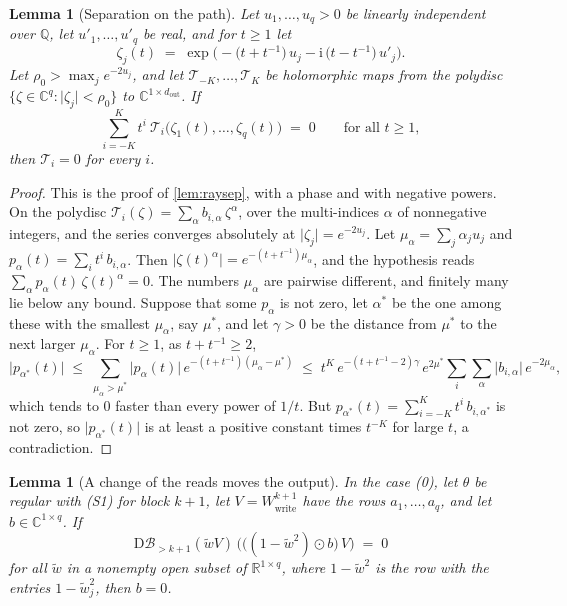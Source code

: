 \documentclass[10pt]{article}
\newtheorem{lemma}[theorem]{Lemma}
\theoremstyle{definition}
\theoremstyle{remark}
\newcommand{\R}{\mathbb{R}}
\newcommand{\Wwrite}{W_{\mathrm{write}}}
\newcommand{\Der}{\mathrm{D}}
\begin{document}
\begin{lemma}[Separation on the path]\label{lem:e0sep}
Let $u_1, \dots, u_q > 0$ be linearly independent over $\mathbb Q$, let $u'_1, \dots, u'_q$ be real, and for $t \ge 1$ let
\[
\zeta_j(t) \;=\; \exp\Big(-\big(t + t^{-1}\big)\,u_j - \mathrm i\,\big(t - t^{-1}\big)\,u'_j\Big).
\]
Let $\rho_0 > \max_j e^{-2u_j}$, and let $\mathcal T_{-K}, \dots, \mathcal T_K$ be holomorphic maps from the polydisc $\{\zeta \in \mathbb C^q : \lvert\zeta_j\rvert < \rho_0\}$ to $\mathbb C^{1\times d_{\mathrm{out}}}$. If
\[
\sum_{i=-K}^{K} t^i\ \mathcal T_i\big(\zeta_1(t), \dots, \zeta_q(t)\big) \;=\; 0 \qquad\text{for all } t \ge 1,
\]
then $\mathcal T_i = 0$ for every $i$.
\end{lemma}

\begin{proof}
This is the proof of \cref{lem:raysep}, with a phase and with negative powers. On the polydisc $\mathcal T_i(\zeta) = \sum_\alpha b_{i,\alpha}\,\zeta^\alpha$, over the multi-indices $\alpha$ of nonnegative integers, and the series converges absolutely at $\lvert\zeta_j\rvert = e^{-2u_j}$. Let $\mu_\alpha = \sum_j\alpha_ju_j$ and $p_\alpha(t) = \sum_i t^i\,b_{i,\alpha}$. Then $\lvert\zeta(t)^\alpha\rvert = e^{-(t + t^{-1})\mu_\alpha}$, and the hypothesis reads $\sum_\alpha p_\alpha(t)\,\zeta(t)^\alpha = 0$. The numbers $\mu_\alpha$ are pairwise different, and finitely many lie below any bound. Suppose that some $p_\alpha$ is not zero, let $\alpha^*$ be the one among these with the smallest $\mu_\alpha$, say $\mu^*$, and let $\gamma > 0$ be the distance from $\mu^*$ to the next larger $\mu_\alpha$. For $t \ge 1$, as $t + t^{-1} \ge 2$,
\[
\lvert p_{\alpha^*}(t)\rvert \;\le\; \sum_{\mu_\alpha > \mu^*}\lvert p_\alpha(t)\rvert\,e^{-(t + t^{-1})(\mu_\alpha - \mu^*)} \;\le\; t^K\,e^{-(t + t^{-1} - 2)\gamma}\,e^{2\mu^*}\sum_{i}\sum_\alpha\lvert b_{i,\alpha}\rvert\,e^{-2\mu_\alpha},
\]
which tends to $0$ faster than every power of $1/t$. But $p_{\alpha^*}(t) = \sum_{i=-K}^{K}t^i\,b_{i,\alpha^*}$ is not zero, so $\lvert p_{\alpha^*}(t)\rvert$ is at least a positive constant times $t^{-K}$ for large $t$, a contradiction.
\end{proof}

\begin{lemma}[A change of the reads moves the output]\label{lem:e0wedge}
In the case (0), let $\theta$ be regular with (S1) for block $k+1$, let $V = \Wwrite^{k+1}$ have the rows $a_1, \dots, a_q$, and let $b \in \mathbb C^{1\times q}$. If
\[
\Der\mathcal B_{>k+1}(\tilde wV)\,\Big(\big((1 - \tilde w^2)\odot b\big)\,V\Big) \;=\; 0
\]
for all $\tilde w$ in a nonempty open subset of $\R^{1\times q}$, where $1 - \tilde w^2$ is the row with the entries $1 - \tilde w_j^2$, then $b = 0$.
\end{lemma}
\end{document}
